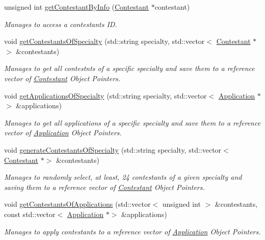 \begin{DoxyCompactItemize}
unsigned int \hyperlink{class_company_ae6e1537b2cd2c2d8c4906f67dfbb80ca}{get\+Contestant\+By\+Info} (\hyperlink{class_contestant}{Contestant} $\ast$contestant)
\begin{DoxyCompactList}\small\item\em Manages to access a contestant\textquotesingle{}s ID. \end{DoxyCompactList}\item 
void \hyperlink{class_company_a64ff4709f2a3d567b1e2fd55f308a665}{get\+Contestants\+Of\+Specialty} (std\+::string specialty, std\+::vector$<$ \hyperlink{class_contestant}{Contestant} $\ast$$>$ \&contestants)
\begin{DoxyCompactList}\small\item\em Manages to get all contestnts of a specific specialty and save them to a reference vector of \hyperlink{class_contestant}{Contestant} Object Pointers. \end{DoxyCompactList}\item 
void \hyperlink{class_company_aaa349bd5785e941e985384f3b9a05288}{get\+Applications\+Of\+Specialty} (std\+::string specialty, std\+::vector$<$ \hyperlink{class_application}{Application} $\ast$$>$ \&applications)
\begin{DoxyCompactList}\small\item\em Manages to get all applications of a specific specialty and save them to a reference vector of \hyperlink{class_application}{Application} Object Pointers. \end{DoxyCompactList}\item 
void \hyperlink{class_company_ac637492635bbf4e2ab0c90e2681f8732}{generate\+Contestants\+Of\+Specialty} (std\+::string specialty, std\+::vector$<$ \hyperlink{class_contestant}{Contestant} $\ast$$>$ \&contestants)
\begin{DoxyCompactList}\small\item\em Manages to randomly select, at least, 24 contestants of a given specialty and saving them to a reference vector of \hyperlink{class_contestant}{Contestant} Object Pointers. \end{DoxyCompactList}\item 
void \hyperlink{class_company_a84df3faac90c9fa0d966e381a6d7459c}{get\+Contestants\+Of\+Applications} (std\+::vector$<$ unsigned int $>$ \&contestants, const std\+::vector$<$ \hyperlink{class_application}{Application} $\ast$$>$ \&applications)
\begin{DoxyCompactList}\small\item\em Manages to apply contestants to a reference vector of \hyperlink{class_application}{Application} Object Pointers. \end{DoxyCompactList}\item 

\end{DoxyCompactItemize}
